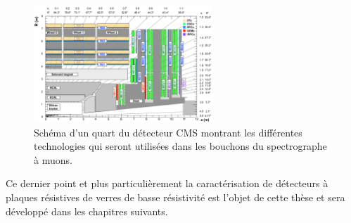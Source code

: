 \begin{itemize}[label=$\bullet$]
	\begin{figure}[ht!]
	\centering
	\includegraphics[width=0.60\textwidth]{CMS/endcap.png}
	\captionsetup{type=figure}\caption{Schéma d'un quart du détecteur CMS montrant les différentes technologies qui seront utilisées dans les bouchons du spectrographe à muons.}
	\label{end}
\end{figure}
\end{itemize}
Ce dernier point et plus particulièrement la caractérisation de détecteurs à plaques résistives de verres de basse résistivité est l'objet de cette thèse et sera développé dans les chapitres suivants.